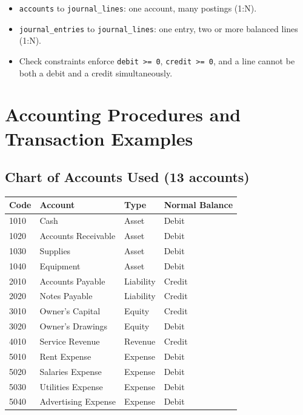 \documentclass[11pt]{article}
\begin{document}
\begin{itemize}
    \item \texttt{accounts} to \texttt{journal\_lines}: one account, many postings (1:N).
    \item \texttt{journal\_entries} to \texttt{journal\_lines}: one entry, two or more balanced lines (1:N).
    \item Check constraints enforce \texttt{debit >= 0}, \texttt{credit >= 0}, and a line cannot be both a debit and a credit simultaneously.
\end{itemize}

\section{Accounting Procedures and Transaction Examples}

\subsection*{Chart of Accounts Used (13 accounts)}

\begin{longtable}{l l l l}
\toprule
\textbf{Code} & \textbf{Account} & \textbf{Type} & \textbf{Normal Balance} \\
\midrule
\endhead
1010 & Cash & Asset & Debit \\
1020 & Accounts Receivable & Asset & Debit \\
1030 & Supplies & Asset & Debit \\
1040 & Equipment & Asset & Debit \\
2010 & Accounts Payable & Liability & Credit \\
2020 & Notes Payable & Liability & Credit \\
3010 & Owner's Capital & Equity & Credit \\
3020 & Owner's Drawings & Equity & Debit \\
4010 & Service Revenue & Revenue & Credit \\
5010 & Rent Expense & Expense & Debit \\
5020 & Salaries Expense & Expense & Debit \\
5030 & Utilities Expense & Expense & Debit \\
5040 & Advertising Expense & Expense & Debit \\
\bottomrule
\end{longtable}
\end{document}
